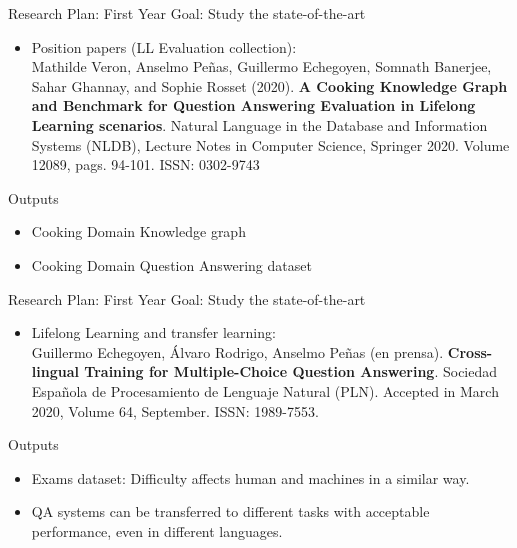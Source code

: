 \documentclass{beamer}
\begin{document}
\begin{frame}{Research Plan: First Year}
  \vspace{-0.2cm}
  \alert{Goal}: Study the state-of-the-art
  \vspace{0.1cm}
  \begin{itemize}
    \item Position papers (LL Evaluation collection): \\
      {\small Mathilde Veron, Anselmo Peñas, Guillermo Echegoyen, Somnath Banerjee, Sahar Ghannay, and Sophie Rosset (2020). \textbf{A Cooking Knowledge Graph and Benchmark for Question Answering Evaluation in Lifelong Learning scenarios}. Natural Language in the Database and Information Systems (NLDB), Lecture Notes in Computer Science, Springer 2020. Volume 12089, pags. 94-101. ISSN: 0302-9743 \cite{veron_nldb_2020}}
  \end{itemize}
  \begin{block}{Outputs}
    \begin{itemize}
      \item Cooking Domain Knowledge graph
      \item Cooking Domain Question Answering dataset
    \end{itemize}
  \end{block}
\end{frame}

\begin{frame}{Research Plan: First Year}
  \vspace{-0.2cm}
  \alert{Goal}: Study the state-of-the-art
  \vspace{0.1cm}
  \begin{itemize}
    \item Lifelong Learning and transfer learning: \\
      {\small Guillermo Echegoyen, Álvaro Rodrigo, Anselmo Peñas (en prensa). \textbf{Cross-lingual Training for Multiple-Choice Question Answering}. Sociedad Española de Procesamiento de Lenguaje Natural (PLN). Accepted in March 2020, Volume 64, September. ISSN: 1989-7553. \cite{echegoyen_sepln_2020}}
  \end{itemize}
  \begin{block}{Outputs}
    \begin{itemize}
      \item Exams dataset: Difficulty affects human and machines in a similar way.
      \item QA systems can be transferred to different tasks with acceptable performance, even in different languages.
    \end{itemize}
  \end{block}
\end{frame}
\end{document}
